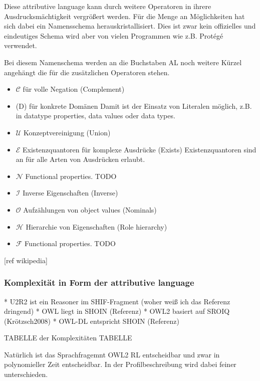 Diese attributive language kann durch weitere Operatoren in ihrere Ausdrucksmächtigkeit vergrößert werden. Für die Menge an Möglichkeiten hat sich dabei ein Namensschema herauskristallisiert. Dies ist zwar kein offizielles und eindeutiges Schema wird aber von vielen Programmen wie z.B. Protégé verwendet.

Bei diesem Namenschema werden an die Buchstaben AL noch weitere Kürzel angehängt die für die zusätzlichen Operatoren stehen.
\begin{itemize}
  \item $\mathcal{C}$ für volle Negation (Complement)
  \item (D) für konkrete Domänen\newline
Damit ist der Einsatz von Literalen möglich, z.B. in datatype properties, data values oder data types.
  \item $\mathcal{U}$ Konzeptvereinigung (Union)
  \item $\mathcal{E}$ Existenzquantoren für komplexe Ausdrücke (Exists)\newline
Existenzquantoren sind an für alle Arten von Ausdrücken erlaubt.
  \item $\mathcal{N}$ Functional properties. TODO
  \item $\mathcal{I}$ Inverse Eigenschaften (Inverse)
  \item $\mathcal{O}$ Aufzählungen von object values (Nominals)
  \item $\mathcal{H}$ Hierarchie von Eigenschaften (Role hierarchy)
  \item $\mathcal{F}$ Functional properties. TODO
\end{itemize} [ref wikipedia]

\subsubsection{Komplexität in Form der attributive language}
 * U2R2 ist ein Reasoner im SHIF-Fragment (woher weiß ich das Referenz dringend)
 * OWL liegt in SHOIN (Referenz)
 * OWL2 basiert auf SROIQ (Krötzsch2008)
 * OWL-DL entspricht SHOIN (Referenz)

TABELLE der Komplexitäten TABELLE




Natürlich ist das Sprachfragemnt OWL2 RL entscheidbar und zwar in polynomieller Zeit entscheidbar. In der Profilbeschreibung wird dabei feiner unterschieden.

